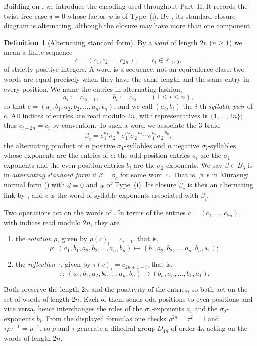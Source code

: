 \documentclass[11pt]{article}
\theoremstyle{definition}
\newtheorem{definition}[definition]{Definition}
\begin{document}
\noindent Building on , we introduce the encoding used
throughout Part~II. It records the twist-free case $d=0$ whose factor $w$ is of
Type~\textup{(i)}. By , its standard closure diagram is
alternating, although the closure may have more than one component.

\begin{definition}[Alternating standard form]\label{def:standard_form}
By a \emph{word} of length $2n$ \textup{(}$n\ge1$\textup{)} we mean a finite sequence
\[
c=(c_{1},c_{2},\dots,c_{2n}),\qquad c_{i}\in\mathbb{Z}_{>0},
\]
of strictly positive integers. A word is a sequence, not an equivalence class: two words
are equal precisely when they have the same length and the same entry in every position.
We name the entries in alternating fashion,
\[
a_{i}:=c_{2i-1},\qquad b_{i}:=c_{2i}\qquad(1\le i\le n),
\]
so that $c=(a_{1},b_{1},a_{2},b_{2},\dots,a_{n},b_{n})$, and we call $(a_{i},b_{i})$ the
$i$-th \emph{syllable pair} of $c$. All indices of entries are read modulo $2n$, with
representatives in $\{1,\dots,2n\}$; thus $c_{i+2n}=c_{i}$ by convention. To such a word
we associate the $3$-braid
\[
\beta_c = \sigma_{1}^{a_1}\sigma_{2}^{-b_1}\sigma_{1}^{a_2}\sigma_{2}^{-b_2}\cdots
\sigma_{1}^{a_n}\sigma_{2}^{-b_n},
\]
the alternating product of $n$ positive $\sigma_{1}$-syllables and $n$ negative
$\sigma_{2}$-syllables whose exponents are the entries of $c$: the odd-position entries
$a_{i}$ are the $\sigma_{1}$-exponents and the even-position entries $b_{i}$ are the
$\sigma_{2}$-exponents. We say $\beta\in B_{3}$ is in \emph{alternating standard form} if
$\beta=\beta_c$ for some word $c$. That is, $\beta$ is in Murasugi normal
form () with $d=0$ and $w$ of Type~(i). Its closure
$\widehat{\beta_c}$ is then an alternating link by , and $c$ is
the word of syllable exponents associated with $\beta_c$.
\end{definition}

\noindent Two operations act on the words of . In terms of the
entries $c=(c_{1},\dots,c_{2n})$, with indices read modulo $2n$, they are
\begin{enumerate}[label=\textup{(\alph*)}]
\item the \emph{rotation} $\rho$, given by $\rho(c)_{i}=c_{i+1}$, that is,
\[
\rho\colon\ (a_1,b_1,a_2,b_2,\dots,a_n,b_n)\longmapsto
(b_1,a_2,b_2,\dots,a_n,b_n,a_1);
\]
\item the \emph{reflection} $\tau$, given by $\tau(c)_{i}=c_{2n+1-i}$, that is,
\[
\tau\colon\ (a_1,b_1,a_2,b_2,\dots,a_n,b_n)\longmapsto
(b_n,a_n,\dots,b_1,a_1).
\]
\end{enumerate}
Both preserve the length $2n$ and the positivity of the entries, so both act on the set of
words of length $2n$. Each of them sends odd positions to even positions and vice versa,
hence interchanges the roles of the $\sigma_{1}$-exponents $a_{i}$ and the
$\sigma_{2}$-exponents $b_{i}$. From the displayed formulas one checks
$\rho^{2n}=\tau^{2}=1$ and $\tau\rho\tau^{-1}=\rho^{-1}$, so $\rho$ and $\tau$ generate a
dihedral group $D_{4n}$ of order $4n$ acting on the words of length $2n$.
\end{document}
